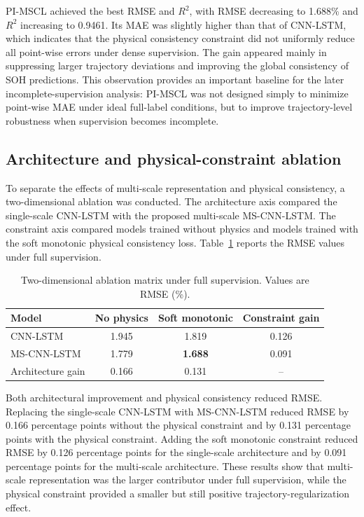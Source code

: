 PI-MSCL achieved the best RMSE and $R^2$, with RMSE decreasing to 1.688\% and $R^2$ increasing to 0.9461. Its MAE was slightly higher than that of CNN-LSTM, which indicates that the physical consistency constraint did not uniformly reduce all point-wise errors under dense supervision. The gain appeared mainly in suppressing larger trajectory deviations and improving the global consistency of SOH predictions. This observation provides an important baseline for the later incomplete-supervision analysis: PI-MSCL was not designed simply to minimize point-wise MAE under ideal full-label conditions, but to improve trajectory-level robustness when supervision becomes incomplete.

\subsection{Architecture and physical-constraint ablation}
\label{subsec:ablation_results}

To separate the effects of multi-scale representation and physical consistency, a two-dimensional ablation was conducted. The architecture axis compared the single-scale CNN-LSTM with the proposed multi-scale MS-CNN-LSTM. The constraint axis compared models trained without physics and models trained with the soft monotonic physical consistency loss. Table~\ref{tab:ablation_matrix_full} reports the RMSE values under full supervision.

\begin{table}[t]
\caption{Two-dimensional ablation matrix under full supervision. Values are RMSE (\%).}
\label{tab:ablation_matrix_full}
\centering
\begin{tabular}{lccc}
\toprule
Model & No physics & Soft monotonic & Constraint gain \\
\midrule
CNN-LSTM & 1.945 & 1.819 & 0.126 \\
MS-CNN-LSTM & 1.779 & \textbf{1.688} & 0.091 \\
Architecture gain & 0.166 & 0.131 & -- \\
\bottomrule
\end{tabular}
\end{table}

Both architectural improvement and physical consistency reduced RMSE. Replacing the single-scale CNN-LSTM with MS-CNN-LSTM reduced RMSE by 0.166 percentage points without the physical constraint and by 0.131 percentage points with the physical constraint. Adding the soft monotonic constraint reduced RMSE by 0.126 percentage points for the single-scale architecture and by 0.091 percentage points for the multi-scale architecture. These results show that multi-scale representation was the larger contributor under full supervision, while the physical constraint provided a smaller but still positive trajectory-regularization effect.

